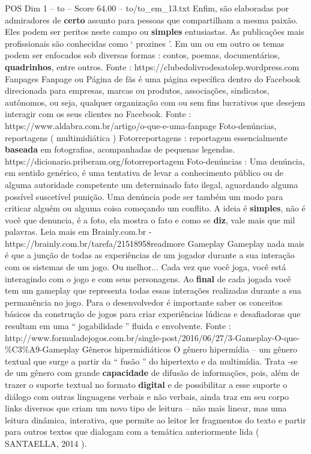 \begin{textsample}{POS Dim 1 – to – Score 64.00 – to/to\_em\_13.txt}
Enfim, são elaboradas por admiradores de \textbf{certo} assunto para pessoas que compartilham a mesma paixão.
Eles podem ser peritos neste campo ou \textbf{simples} entusiastas.
As publicações mais profissionais são conhecidas como ‘ prozines ’.
Em um ou em outro os temas podem ser enfocados sob diversas formas : contos, poemas, documentários, \textbf{quadrinhos}, entre outros.
Fonte : https://clubedolivrodesatolep.wordpress.com Fanpages Fanpage ou Página de fãs é uma página específica dentro do Facebook direcionada para empresas, marcas ou produtos, associações, sindicatos, autônomos, ou seja, qualquer organização com ou sem fins lucrativos que desejem interagir com os seus clientes no Facebook.
Fonte : https://www.aldabra.com.br/artigo/o-que-e-uma-fanpage Foto-denúncias, reportagens ( multimidiática ) Fotorreportagens : reportagem essencialmente \textbf{baseada} em fotografias, acompanhadas de pequenas legendas. https://dicionario.priberam.org/fotorreportagem Foto-denúncias : Uma denúncia, em sentido genérico, é uma tentativa de levar a conhecimento público ou de alguma autoridade competente um determinado fato ilegal, aguardando alguma possível suscetível punição.
Uma denúncia pode ser também um modo para criticar alguém ou alguma coisa começando um conflito.
A ideia é \textbf{simples}, não é você que denuncia, é a foto, ela mostra o fato e como se \textbf{diz}, vale mais que mil palavras.
Leia mais em Brainly.com.br - https://brainly.com.br/tarefa/21518958readmore Gameplay Gameplay nada mais é que a junção de todas as experiências de um jogador durante a sua interação com os sistemas de um jogo.
Ou melhor...
Cada vez que você joga, você está interagindo com o jogo e com seus personagens.
Ao \textbf{final} de cada jogada você tem um gameplay que representa todas essas interações realizadas durante a sua permanência no jogo.
Para o desenvolvedor é importante saber os conceitos básicos da construção de jogos para criar experiências lúdicas e desafiadoras que resultam em uma “ jogabilidade ” fluida e envolvente.
Fonte : http://www.formuladejogos.com.br/single-post/2016/06/27/3-Gameplay-O-que-\%C3\%A9-Gameplay Gêneros hipermidiáticos O gênero hipermídia – um gênero textual que surge a partir da “ fusão ” do hipertexto e da multimídia.
Trata -se de um gênero com grande \textbf{capacidade} de difusão de informações, pois, além de trazer o suporte textual no formato \textbf{digital} e de possibilitar a esse suporte o diálogo com outras linguagens verbais e não verbais, ainda traz em seu corpo links diversos que criam um novo tipo de leitura – não mais linear, mas uma leitura dinâmica, interativa, que permite ao leitor ler fragmentos do texto e partir para outros textos que dialogam com a temática anteriormente lida ( SANTAELLA, 2014 ).

\end{textsample}
